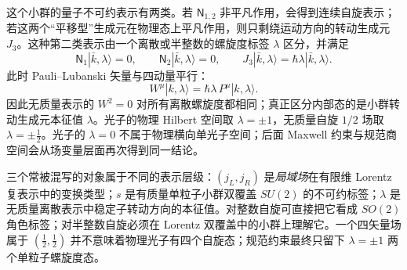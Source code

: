 这个小群的量子不可约表示有两类。若 $\mathsf N_{1,2}$ 非平凡作用，会得到连续自旋表示；若这两个“平移型”生成元在物理态上平凡作用，则只剩绕运动方向的转动生成元 $J_3$。这种第二类表示由一个离散或半整数的螺旋度标签 $\lambda$ 区分，并满足
\begin{equation}
 \mathsf N_1|\bar k,\lambda\rangle=0,
 \qquad
 \mathsf N_2|\bar k,\lambda\rangle=0,
 \qquad
 J_3|\bar k,\lambda\rangle=\hbar\lambda|\bar k,\lambda\rangle.
 \label{eq:massless-helicity-irrep-dp9}
\end{equation}
此时 Pauli--Lubanski 矢量与四动量平行：
\begin{equation}
 \boxed{W^\mu|k,\lambda\rangle
 =\hbar\lambda\,P^\mu|k,\lambda\rangle.}
 \label{eq:massless-pauli-lubanski-helicity-dp9}
\end{equation}
因此无质量表示的 $W^2=0$ 对所有离散螺旋度都相同；真正区分内部态的是小群转动生成元本征值 $\lambda$。光子的物理 Hilbert 空间取 $\lambda=\pm1$，无质量自旋 $1/2$ 场取 $\lambda=\pm\tfrac12$。光子的 $\lambda=0$ 不属于物理横向单光子空间；后面 Maxwell 约束与规范商空间会从场变量层面再次得到同一结论。

三个常被混写的对象属于不同的表示层级：$(j_L,j_R)$ 是\emph{局域场}在有限维 Lorentz 复表示中的变换类型；$s$ 是有质量单粒子小群双覆盖 $SU(2)$ 的不可约标签；$\lambda$ 是无质量离散表示中稳定子转动方向的本征值。对整数自旋可直接把它看成 $SO(2)$ 角色标签；对半整数自旋必须在 Lorentz 双覆盖中的小群上理解它。一个四矢量场属于 $(\tfrac12,\tfrac12)$ 并不意味着物理光子有四个自旋态；规范约束最终只留下 $\lambda=\pm1$ 两个单粒子螺旋度态。

